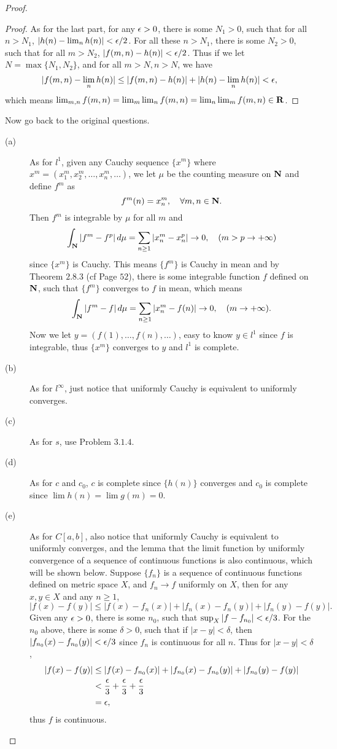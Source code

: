 \begin{proof}
\begin{proof}
		As for the last part, for any $\epsilon>0$, there is some $N_1>0$, such that for all $n>N_1$, $|h(n)-\lim_n h(n)|<\epsilon/2$. For all these $n>N_1$, there is some $N_2>0$, such that for all $m>N_2$, $|f(m,n)-h(n)|<\epsilon/2$. Thus if we let $N=\max\{N_1,N_2\}$, and for all $m>N, n>N$, we have
		\[|f(m,n)-\lim_n h(n)|\leq |f(m,n)-h(n)|+|h(n)-\lim_n h(n)|<\epsilon,\]
		which means $\lim_{m,n} f(m,n)=\lim_m\lim_n f(m,n)=\lim_n\lim_m f(m,n)\in\mathbf{R}$.
	\end{proof}
	Now go back to the original questions.
	\begin{description}
	\item[(a)] As for $l^1$, given any Cauchy sequence $\{x^m\}$ where $x^m=(x_1^m,x_2^m,\dots,x_n^m,\dots)$, we let $\mu$ be the counting measure on $\mathbf{N}$ and define $f^m$ as
	\[f^m(n)=x_n^m,\quad\forall m,n\in\mathbf{N}.\]
	Then $f^m$ is integrable by $\mu$ for all $m$ and
	\[\int_{\mathbf{N}} |f^m-f^p|\,d\mu=\sum_{n\geq 1} |x_n^m-x_n^p|\to 0,\quad (m>p\to+\infty)\]
	since $\{x^m\}$ is Cauchy. This means $\{f^m\}$ is Cauchy in mean and by Theorem $2.8.3$ (cf Page $52$), there is some integrable function $f$ defined on $\mathbf{N}$, such that $\{f^m\}$ converges to $f$ in mean, which means
	\[\int_{\mathbf{N}} |f^m-f|\,d\mu=\sum_{n\geq 1} |x_n^m-f(n)|\to 0,\quad (m\to+\infty).\]
	Now we let $y=(f(1),\dots,f(n),\dots)$, easy to know $y\in l^1$ since $f$ is integrable, thus $\{x^m\}$ converges to $y$ and $l^1$ is complete.
	\item[(b)] As for $l^\infty$, just notice that uniformly Cauchy is equivalent to uniformly converges.
	\item[(c)] As for $s$, use Problem $3.1.4$.
	\item[(d)] As for $c$ and $c_0$, $c$ is complete since $\{h(n)\}$ converges and $c_0$ is complete since $\lim h(n)=\lim g(m)=0$.
	\item[(e)] As for $C[a,b]$, also notice that uniformly Cauchy is equivalent to uniformly converges, and the lemma that the limit function by uniformly convergence of a sequence of continuous functions is also continuous, which will be shown below. Suppose $\{f_n\}$ is a sequence of continuous functions defined on metric space $X$, and $f_n\to f$ uniformly on $X$, then for any $x,y\in X$ and any $n\geq 1$,
	\[|f(x)-f(y)|\leq |f(x)-f_n(x)|+|f_n(x)-f_n(y)|+|f_n(y)-f(y)|.\]
	Given any $\epsilon>0$, there is some $n_0$, such that $\sup_X|f-f_{n_0}|<\epsilon/3$. For the $n_0$ above, there is some $\delta>0$, such that if $|x-y|<\delta$, then $|f_{n_0}(x)-f_{n_0}(y)|<\epsilon/3$ since $f_n$ is continuous for all $n$. Thus for $|x-y|<\delta$,
	\begin{align*}
		|f(x)-f(y)|&\leq |f(x)-f_{n_0}(x)|+|f_{n_0}(x)-f_{n_0}(y)|+|f_{n_0}(y)-f(y)|\\
				   &<\frac{\epsilon}{3}+\frac{\epsilon}{3}+\frac{\epsilon}{3}\\
				   &=\epsilon,
	\end{align*}
	thus $f$ is continuous. 


\end{description}
\end{proof}

